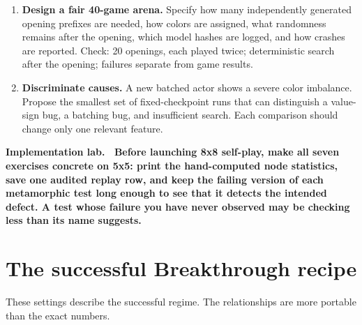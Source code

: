 \documentclass[10.5pt,letterpaper]{article}
\newcommand{\boxtitle}[1]{\sffamily\bfseries\color{deepblue}#1.\ }
\begin{document}
\begin{enumerate}
  \item \textbf{Design a fair 40-game arena.} Specify how many independently
        generated opening prefixes are needed, how colors are assigned, what
        randomness remains after the opening, which model hashes are logged,
        and how crashes are reported. Check: 20 openings, each played twice;
        deterministic search after the opening; failures separate from game
        results.

  \item \textbf{Discriminate causes.} A new batched actor shows a severe color
        imbalance. Propose the smallest set of fixed-checkpoint runs that can
        distinguish a value-sign bug, a batching bug, and insufficient search.
        Each comparison should change only one relevant feature.
\end{enumerate}

\begin{plainbox}
\boxtitle{Implementation lab}
Before launching 8x8 self-play, make all seven exercises concrete on 5x5:
print the hand-computed node statistics, save one audited replay row, and keep
the failing version of each metamorphic test long enough to see that it detects
the intended defect. A test whose failure you have never observed may be
checking less than its name suggests.
\end{plainbox}

\section{The successful Breakthrough recipe}

These settings describe the successful regime. The relationships are more
portable than the exact numbers.
\end{document}
